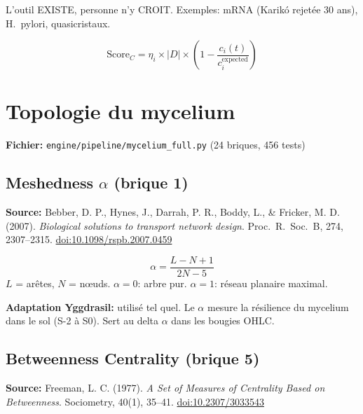 \documentclass[11pt,a4paper]{article}
\begin{document}
L'outil EXISTE, personne n'y CROIT.
Exemples: mRNA (Karik\'o rejet\'ee 30 ans), H.\ pylori, quasicristaux.

\begin{equation}
\text{Score}_C = \eta_i \times |D| \times \left(1 - \frac{c_i(t)}{c_i^{\text{expected}}}\right)
\end{equation}

\section{Topologie du mycelium}

\textbf{Fichier:} \texttt{engine/pipeline/mycelium\_full.py} (24 briques, 456 tests)

\subsection{Meshedness $\alpha$ (brique 1)}

\textbf{Source:} Bebber, D. P., Hynes, J., Darrah, P. R., Boddy, L., \& Fricker, M. D. (2007).
\textit{Biological solutions to transport network design}.
Proc.\ R.\ Soc.\ B, 274, 2307--2315.
\href{https://doi.org/10.1098/rspb.2007.0459}{doi:10.1098/rspb.2007.0459}

\begin{equation}
\alpha = \frac{L - N + 1}{2N - 5}
\end{equation}
$L$ = ar\^etes, $N$ = n\oe uds. $\alpha = 0$: arbre pur. $\alpha = 1$: r\'eseau planaire maximal.

\textbf{Adaptation Yggdrasil:} utilis\'e tel quel. Le $\alpha$ mesure la r\'esilience
du mycelium dans le sol (S-2 \`a S0). Sert au delta $\alpha$ dans les bougies OHLC.

\subsection{Betweenness Centrality (brique 5)}

\textbf{Source:} Freeman, L. C. (1977).
\textit{A Set of Measures of Centrality Based on Betweenness}.
Sociometry, 40(1), 35--41.
\href{https://doi.org/10.2307/3033543}{doi:10.2307/3033543}
\end{document}
